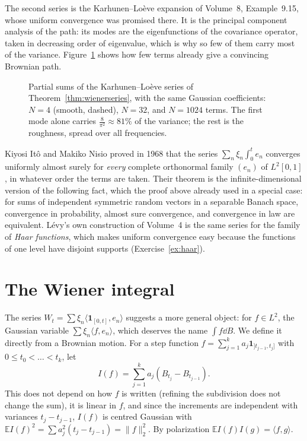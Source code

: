 The second series is the Karhunen--Lo\`eve expansion of Volume~8, Example~9.15, whose uniform convergence was promised there. It is the principal component analysis of the path: its modes are the
eigenfunctions of the covariance operator, taken in decreasing order of eigenvalue, which is why so few of them carry most of the variance. Figure~\ref{fig:wienerseries} shows how few terms already give a convincing Brownian path.

\begin{figure}[ht]
\centering
{}
\caption{Partial sums of the Karhunen--Lo\`eve series of Theorem~\ref{thm:wienerseries}, with the same Gaussian coefficients: $N=4$ (smooth, dashed), $N=32$, and $N=1024$ terms. The first mode alone carries
$\frac8{\pi^2}\approx81\%$ of the variance; the rest is the roughness, spread over all frequencies.}
\label{fig:wienerseries}
\end{figure}

\begin{remark}
Kiyosi It\^o and Makiko Nisio proved in 1968 that the series $\sum_n\xi_n\int_0^te_n$ converges uniformly almost surely for \emph{every} complete orthonormal family $(e_n)$ of $L^2[0,1]$, in whatever order the terms are taken.
Their theorem is the infinite-dimensional version of the following fact, which the proof above already used in a special case: for sums of independent symmetric random vectors in a separable Banach space,
convergence in probability, almost sure convergence, and convergence in law are equivalent. L\'evy's own construction of Volume~4 is the same series for the family of \emph{Haar functions}, which makes uniform
convergence easy because the functions of one level have disjoint supports (Exercise~\ref{ex:haar}).
\end{remark}

\section{The Wiener integral}\label{sec:wienerint}

The series $W_t=\sum\xi_n\langle\mathbf 1_{[0,t]},e_n\rangle$ suggests a more general object: for $f\in L^2$, the Gaussian variable $\sum\xi_n\langle f,e_n\rangle$, which deserves the name $\int f\dd B$. We define it
directly from a Brownian motion. For a step function $f=\sum_{j=1}^ka_j\mathbf 1_{]t_{j-1},t_j]}$ with $0\le t_0<\dots<t_k$, let
\[
I(f)=\sum_{j=1}^ka_j(B_{t_j}-B_{t_{j-1}}).
\]
This does not depend on how $f$ is written (refining the subdivision does not change the sum), it is linear in $f$, and since the increments are independent with variances $t_j-t_{j-1}$, $I(f)$ is centred
Gaussian with $\mathbb E I(f)^2=\sum a_j^2(t_j-t_{j-1})=\|f\|_2^2$. By polarization $\mathbb E I(f)I(g)=\langle f,g\rangle$.

